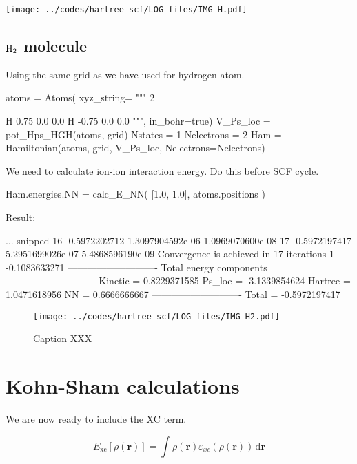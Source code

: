 {\center
\texttt{[image: ../codes/hartree\_scf/LOG\_files/IMG\_H.pdf]}
\par}




\subsection{$\ce{H2}$ molecule}


Using the same grid as we have used for hydrogen atom.

\begin{juliacode}
atoms = Atoms( xyz_string=
  """
  2
  
  H   0.75  0.0  0.0
  H  -0.75  0.0  0.0
  """, in_bohr=true)
V_Ps_loc = pot_Hps_HGH(atoms, grid)
Nstates = 1
Nelectrons = 2
Ham = Hamiltonian(atoms, grid, V_Ps_loc, Nelectrons=Nelectrons)
\end{juliacode}

We need to calculate ion-ion interaction energy. Do this before SCF cycle.
\begin{juliacode}
Ham.energies.NN = calc_E_NN( [1.0, 1.0], atoms.positions )
\end{juliacode}

Result:
\begin{textcode}
... snipped
16      -0.5972202712   1.3097904592e-06   1.0969070600e-08
17      -0.5972197417   5.2951699026e-07   5.4868596190e-09
Convergence is achieved in 17 iterations
1      -0.1083633271
----------------------------
Total energy components
----------------------------
Kinetic =       0.8229371585
Ps_loc  =      -3.1339854624
Hartree =       1.0471618956
NN      =       0.6666666667
----------------------------
Total   =      -0.5972197417
\end{textcode}

\begin{figure}[h]
\begin{center}
\texttt{[image: ../codes/hartree\_scf/LOG\_files/IMG\_H2.pdf]}
\end{center}
\caption{Caption XXX}
\end{figure}




\section{Kohn-Sham calculations}

We are now ready to include the XC term.

\begin{equation}
E_{\mathrm{xc}}[\rho(\mathbf{r})] = \int \rho(\mathbf{r})
\varepsilon_{xc}(\rho(\mathbf{r}))\,\mathrm{d}\mathbf{r}
\end{equation}

